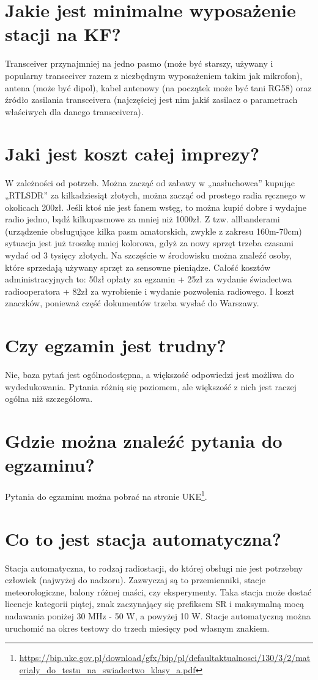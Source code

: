\documentclass[a4paper,12pt]{article}
\begin{document}
\section{Jakie jest minimalne wyposażenie stacji na KF?}
Transceiver przynajmniej na jedno pasmo (może być starszy, używany i popularny transceiver razem z niezbędnym wyposażeniem takim jak mikrofon), antena (może być dipol), kabel antenowy (na początek może być tani RG58) oraz źródło zasilania transceivera (najczęściej jest nim jakiś zasilacz o parametrach właściwych dla danego transceivera).

\section{Jaki jest koszt całej imprezy?}
W zależności od potrzeb. Można zacząć od zabawy w „nasłuchowca” kupując „RTLSDR” za kilkadziesiąt złotych, można zacząć od prostego radia ręcznego w okolicach 200zł. Jeśli ktoś nie jest fanem wstęg, to można kupić dobre i wydajne radio jedno, bądź kilkupasmowe za mniej niż 1000zł. Z tzw. allbanderami (urządzenie obsługujące kilka pasm amatorskich, zwykle z zakresu 160m-70cm) sytuacja jest już troszkę mniej kolorowa, gdyż za nowy sprzęt trzeba czasami wydać od 3 tysięcy złotych. Na szczęście w środowisku można znaleźć osoby, które sprzedają używany sprzęt za sensowne pieniądze.
Całość kosztów administracyjnych to: 50zł opłaty za egzamin + 25zł za wydanie świadectwa radiooperatora + 82zł za wyrobienie i wydanie pozwolenia radiowego. I koszt znaczków, ponieważ część dokumentów trzeba wysłać do Warszawy.

\section{Czy egzamin jest trudny?}
Nie, baza pytań jest ogólnodostępna, a większość odpowiedzi jest możliwa do wydedukowania. Pytania różnią się poziomem, ale większość z nich jest raczej ogólna niż szczegółowa.

\section{Gdzie można znaleźć pytania do egzaminu?}
Pytania do egzaminu można pobrać na stronie UKE\footnote{\url{https://bip.uke.gov.pl/download/gfx/bip/pl/defaultaktualnosci/130/3/2/materialy_do_testu_na_swiadectwo_klasy_a.pdf}}.

\section{Co to jest stacja automatyczna?}
Stacja automatyczna, to rodzaj radiostacji, do której obsługi nie jest potrzebny człowiek (najwyżej do nadzoru). Zazwyczaj są to przemienniki, stacje meteorologiczne, balony różnej maści, czy eksperymenty. Taka stacja może dostać licencje kategorii piątej, znak zaczynający się prefiksem SR i maksymalną mocą nadawania poniżej 30 MHz - 50 W, a powyżej 10 W.
Stacje automatyczną można uruchomić na okres testowy do trzech miesięcy pod własnym znakiem.
\end{document}
